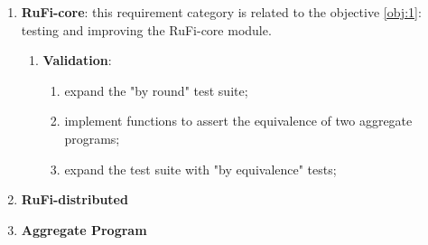 \begin{enumerate}
    \item \textbf{RuFi-core}: this requirement category is related to the objective \ref{obj:1}: testing and improving the RuFi-core module.
          \begin{enumerate}
              \item \textbf{Validation}:
                    \begin{enumerate}
                        \item expand the "by round" test suite;
                        \item implement functions to assert the equivalence of two aggregate programs;
                        \item expand the test suite with "by equivalence" tests;
                    \end{enumerate}
          \end{enumerate}
    \item \textbf{RuFi-distributed}
    \item \textbf{Aggregate Program}
\end{enumerate}
